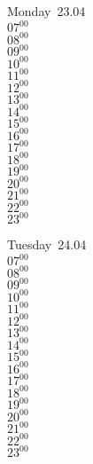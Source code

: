 \documentclass[11pt, a4paper]{book}\usepackage[]{graphicx}\usepackage[]{color}
\begin{document}
\begin{headerbox}
\end{headerbox}
\begin{weekdaybox}
  Monday~23.04\\
  { 
  \vfill
  $07^{00}$\\
$08^{00}$\\
$09^{00}$\\
$10^{00}$\\
$11^{00}$\\
$12^{00}$\\
$13^{00}$\\
$14^{00}$\\
$15^{00}$\\
$16^{00}$\\
$17^{00}$\\
$18^{00}$\\
$19^{00}$\\
$20^{00}$\\
$21^{00}$\\
$22^{00}$\\
$23^{00}$\\
  }
\end{weekdaybox}
\begin{weekdaybox}
  Tuesday~24.04\\
  { 
  \vfill
  $07^{00}$\\
$08^{00}$\\
$09^{00}$\\
$10^{00}$\\
$11^{00}$\\
$12^{00}$\\
$13^{00}$\\
$14^{00}$\\
$15^{00}$\\
$16^{00}$\\
$17^{00}$\\
$18^{00}$\\
$19^{00}$\\
$20^{00}$\\
$21^{00}$\\
$22^{00}$\\
$23^{00}$\\
  }
\end{weekdaybox}
\end{document}
